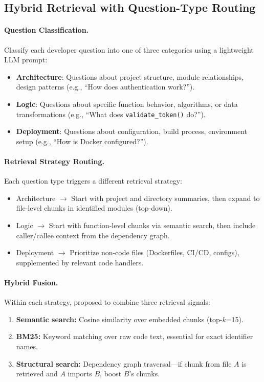 \documentclass[11pt]{article}
\begin{document}
\subsection{Hybrid Retrieval with Question-Type Routing}
\label{sec:retrieval}

\paragraph{Question Classification.} Classify each developer question into one of three categories using a lightweight LLM prompt:
\begin{itemize}
    \item \textbf{Architecture}: Questions about project structure, module relationships, design patterns (e.g., ``How does authentication work?'').
    \item \textbf{Logic}: Questions about specific function behavior, algorithms, or data transformations (e.g., ``What does \texttt{validate\_token()} do?'').
    \item \textbf{Deployment}: Questions about configuration, build process, environment setup (e.g., ``How is Docker configured?'').
\end{itemize}

\paragraph{Retrieval Strategy Routing.} Each question type triggers a different retrieval strategy:
\begin{itemize}
    \item Architecture $\rightarrow$ Start with project and directory summaries, then expand to file-level chunks in identified modules (top-down).
    \item Logic $\rightarrow$ Start with function-level chunks via semantic search, then include caller/callee context from the dependency graph.
    \item Deployment $\rightarrow$ Prioritize non-code files (Dockerfiles, CI/CD, configs), supplemented by relevant code handlers.
\end{itemize}

\paragraph{Hybrid Fusion.} Within each strategy, proposed to combine three retrieval signals:
\begin{enumerate}
    \item \textbf{Semantic search:} Cosine similarity over embedded chunks (top-$k$=15).
    \item \textbf{BM25:} Keyword matching over raw code text, essential for exact identifier names.
    \item \textbf{Structural search:} Dependency graph traversal---if chunk from file $A$ is retrieved and $A$ imports $B$, boost $B$'s chunks.
\end{enumerate}
\end{document}
